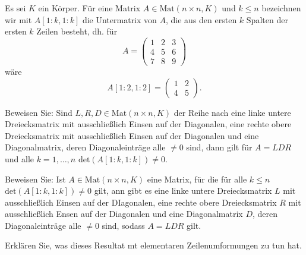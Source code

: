 \begin{Problem}
	Es sei $K$ ein Körper. F\"{u}r eine Matrix $A\in\text{Mat}(n\times n,K)$ und $k\le n$ bezeichnen wir mit $A[1:k,1:k]$ die Untermatrix von $A$, die aus den ersten $k$ Spalten der ersten $k$ Zeilen besteht, dh. f\"{u}r
	\[
		A=\begin{pmatrix} 1 & 2 & 3 \\ 4 & 5 & 6 \\ 7 & 8 & 9 \end{pmatrix} 
	\]
	wäre
	\[
		A[1:2,1:2]=\begin{pmatrix} 1 & 2 \\ 4 & 5 \end{pmatrix} 
	.\] 
	\begin{parts}
	\item Beweisen Sie: Sind $L,R,D\in \text{Mat}(n\times n,K)$ der Reihe nach eine linke untere Dreiecksmatrix mit ausschließlich Einsen auf der Diagonalen, eine rechte obere Dreiecksmatrix mit ausschließlich Einsen auf der Diagonalen und eine Diagonalmatrix, deren Diagonaleinträge alle $\neq 0$ sind, dann gilt f\"{u}r $A=LDR$ und alle $k=1,\dots, n$ $\text{det}(A[1:k,1:k])\neq 0$.
	\item Beweisen Sie: Ist $A\in \text{Mat}(n\times n,K)$ eine Matrix, f\"{u}r die f\"{u}r alle $k\le n$ $\text{det}(A[1:k,1:k])\neq 0$ gilt, ann gibt es eine linke untere Dreiecksmatrix $L$ mit ausschließlich Einsen auf der DIagonalen, eine rechte obere Dreiecksmatrix $R$ mit ausschließlich Ensen auf der Diagonalen und eine Diagonalmatrix $D$, deren Diagonaleinträge alle $\neq 0$ sind, sodass $A=LDR$ gilt.
	\item Erklären Sie, was dieses Resultat mt elementaren Zeilenumformungen zu tun hat.
	\end{parts}
\end{Problem}

